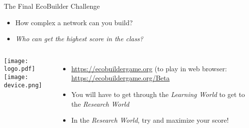   
\begin{frame}{The Final EcoBuilder Challenge}

  \begin{itemize}[<+->] \itemsep6pt
      \item How complex a network can you build?
      \item {\it Who can get the highest score in the class?}
  \end{itemize}

  \begin{columns}[c]
    \centering
      \texttt{[image: logo.pdf]}\\
      \texttt{[image: device.png]}
    \centering
      \begin{itemize}[<+->] \itemsep8pt
        \item \small \url{https://ecobuildergame.org} (to play in web browser: \url{https://ecobuildergame.org/Beta}
        \item You will have to get through the {\it Learning World} to get to the {\it Research World}
        \item In the {\it Research World}, try and maximize your score!
    \end{itemize}
  \end{columns} 

\end{frame}

